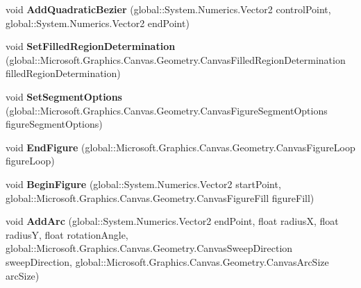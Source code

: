 \begin{DoxyCompactItemize}
void {\bfseries Add\+Quadratic\+Bezier} (global\+::\+System.\+Numerics.\+Vector2 control\+Point, global\+::\+System.\+Numerics.\+Vector2 end\+Point)
\item 
\mbox{\label{interface_microsoft_1_1_graphics_1_1_canvas_1_1_geometry_1_1_i_canvas_path_receiver_a0bcd3e4a427ddf33e3454ce466e35bec}} 
void {\bfseries Set\+Filled\+Region\+Determination} (global\+::\+Microsoft.\+Graphics.\+Canvas.\+Geometry.\+Canvas\+Filled\+Region\+Determination filled\+Region\+Determination)
\item 
\mbox{\label{interface_microsoft_1_1_graphics_1_1_canvas_1_1_geometry_1_1_i_canvas_path_receiver_a5492b54121b4ffc412071f8844a3b6aa}} 
void {\bfseries Set\+Segment\+Options} (global\+::\+Microsoft.\+Graphics.\+Canvas.\+Geometry.\+Canvas\+Figure\+Segment\+Options figure\+Segment\+Options)
\item 
\mbox{\label{interface_microsoft_1_1_graphics_1_1_canvas_1_1_geometry_1_1_i_canvas_path_receiver_acad2c777502ab1ccf0c33ff63873a7c9}} 
void {\bfseries End\+Figure} (global\+::\+Microsoft.\+Graphics.\+Canvas.\+Geometry.\+Canvas\+Figure\+Loop figure\+Loop)
\item 
\mbox{\label{interface_microsoft_1_1_graphics_1_1_canvas_1_1_geometry_1_1_i_canvas_path_receiver_aef7e5c282cbb5cd2800c4626abdf7981}} 
void {\bfseries Begin\+Figure} (global\+::\+System.\+Numerics.\+Vector2 start\+Point, global\+::\+Microsoft.\+Graphics.\+Canvas.\+Geometry.\+Canvas\+Figure\+Fill figure\+Fill)
\item 
\mbox{\label{interface_microsoft_1_1_graphics_1_1_canvas_1_1_geometry_1_1_i_canvas_path_receiver_a50a4758a3ed76ce6c8cd9868b31e29cf}} 
void {\bfseries Add\+Arc} (global\+::\+System.\+Numerics.\+Vector2 end\+Point, float radiusX, float radiusY, float rotation\+Angle, global\+::\+Microsoft.\+Graphics.\+Canvas.\+Geometry.\+Canvas\+Sweep\+Direction sweep\+Direction, global\+::\+Microsoft.\+Graphics.\+Canvas.\+Geometry.\+Canvas\+Arc\+Size arc\+Size)

\end{DoxyCompactItemize}
